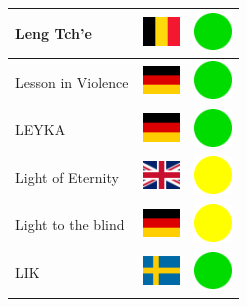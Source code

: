 \documentclass[12pt, a4paper, twoside]{report}
\begin{document}
\begin{center}
\begin{longtable}{|p{5cm}|p{2cm}|p{2cm}|}
 Leng Tch'e                                                 & \includegraphics[width=1cm]{../img/flags/be} &   \includegraphics[width=1cm]{../likes/y} \\ \hline
 Lesson in Violence                                         & \includegraphics[width=1cm]{../img/flags/de} &   \includegraphics[width=1cm]{../likes/y} \\ \hline
 LEYKA                                                      & \includegraphics[width=1cm]{../img/flags/de} &   \includegraphics[width=1cm]{../likes/y} \\ \hline
 Light of Eternity                                          & \includegraphics[width=1cm]{../img/flags/gb} &   \includegraphics[width=1cm]{../likes/m} \\ \hline
 Light to the blind                                         & \includegraphics[width=1cm]{../img/flags/de} &   \includegraphics[width=1cm]{../likes/m} \\ \hline
 LIK                                                        & \includegraphics[width=1cm]{../img/flags/se} &   \includegraphics[width=1cm]{../likes/y} \\ \hline

\end{longtable}
\end{center}
\end{document}
